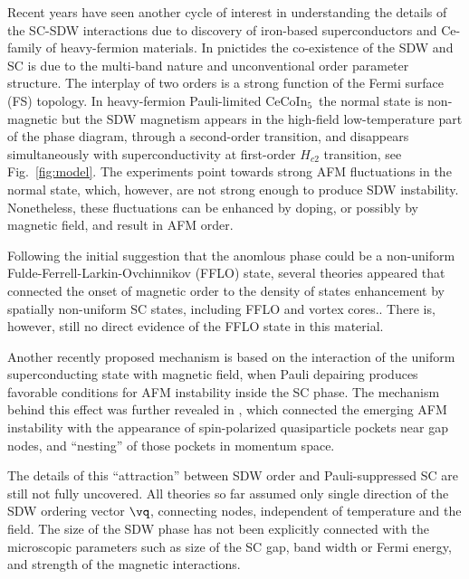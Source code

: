 \documentclass[aps,prl,twocolumn,showpacs,amsmath,amssymb]{revtex4-1}
\newcommand{\cecoin}{CeCoIn$_5$}
\begin{document}
Recent years have seen another cycle of interest in understanding the details of the SC-SDW interactions 
due to discovery of 
iron-based superconductors\cite{Johnston2010_review} 
and 
Ce-family of heavy-fermion materials\cite{Petrovic01_ce115,  Kenzelmann08_Qphase}.
In pnictides the co-existence of the SDW and SC is due to the multi-band nature 
and unconventional order parameter structure. 
The interplay of two orders is a  strong function of the 
Fermi surface (FS) topology.\cite{vor10_sc_sdw,*Fernandes2010_sdw_sc}
In heavy-fermion Pauli-limited \cecoin\ the normal state is non-magnetic but the SDW magnetism 
appears in the high-field low-temperature part of the phase diagram, through a second-order transition, 
and disappears simultaneously with superconductivity at first-order $H_{c2}$ transition, 
see Fig.~\ref{fig:model}.
\cite{Bianchi2003_fflo, Kenzelmann08_Qphase, Kenzelmann10_Qphase}
The experiments point towards strong AFM fluctuations in the normal state,\cite{Paglione03_qcp115,*Bianchi03_qcp115} 
which, however, are not 
strong enough to produce SDW instability. Nonetheless, these fluctuations can be 
enhanced by doping,\cite{Pham2006_doping115,*Gofryk2012_doping115} 
or possibly by magnetic field, and result in AFM order. 

Following the initial suggestion that the anomlous phase could be  
a non-uniform Fulde-Ferrell-Larkin-Ovchinnikov (FFLO) 
state,\cite{ful64,*lar64}
several theories 
appeared that connected the onset of 
magnetic order to the density of states enhancement by spatially non-uniform SC states, including 
FFLO\cite{yanase11_mag_afm_fflo,Miyake08_sdw_fflo} and vortex cores.\cite{suzuki11_sdw_vortex}.
There is, however, still no direct evidence of the FFLO state in this material. 

Another recently proposed mechanism is based on the interaction of the uniform superconducting state 
with magnetic field, when Pauli depairing produces favorable conditions for AFM 
instability inside the SC phase.\cite{ikeda10_sc_afm}
The mechanism behind this effect was further revealed in \cite{kato11_sc_afm}, 
which connected the emerging AFM instability %
with the appearance of spin-polarized 
quasiparticle pockets near gap nodes, 
and ``nesting'' of those pockets in momentum space.  

The details of this ``attraction'' between SDW order and Pauli-suppressed SC 
are still not fully uncovered. 
All theories so far assumed only single direction of the SDW ordering vector $\vq$, connecting nodes, 
independent of temperature and the field. 
The size of the SDW phase has not been explicitly connected with the microscopic parameters such as 
size of the SC gap, band width or Fermi energy, and strength of the magnetic interactions. 
\end{document}
